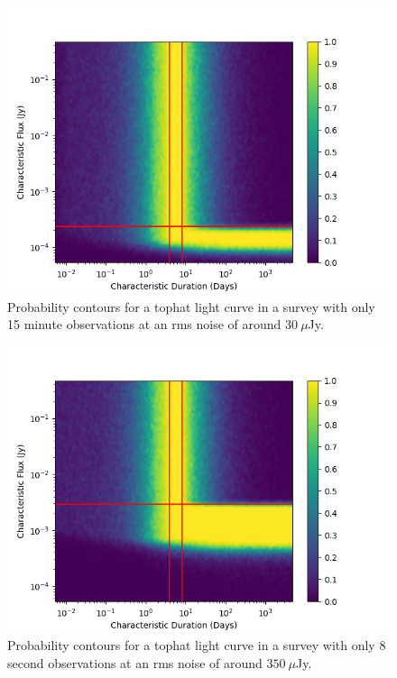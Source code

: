 \documentclass[12pt]{article}
\begin{document}
 \begin{figure}
\includegraphics[width=\columnwidth]{samplescan.png}
\caption{Probability contours for a tophat light curve in a survey with only 15 minute observations at an rms noise of around $30~\mu$Jy.}
\label{samplescan}
 \end{figure}
 \begin{figure}
\includegraphics[width=\columnwidth]{sampleint.png}
\caption{Probability contours for a tophat light curve in a survey with only 8 second observations at an rms noise of around $350~\mu$Jy.}
\label{sampleint}
 \end{figure}
\end{document}
